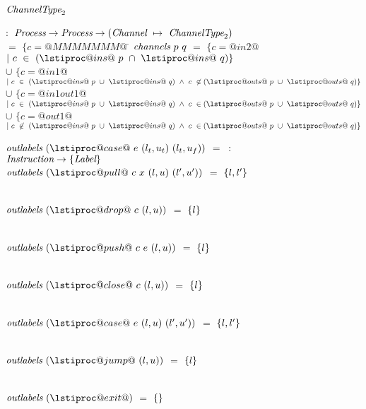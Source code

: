 \begin{figure}

\begin{tabbing}
$\textit{ChannelType}_2$   \TABDEF \kill

 \> $:$ \> $\textit{Process} \to \textit{Process} \to (\textit{Channel} ~\mapsto~ \textit{ChannelType}_2)$ \\

  \> $=$    \> $\{ c=@MMMMMMM@~$\= \kill
$\textit{channels}~p~q$
  \> $=$    \> $\{ c=@in2@$
            \> $|~c~\in~(\lstiproc@ins@~p~\cap~\lstiproc@ins@~q) \}$ 
            \\

  \> $\cup$ \> $\{ c=@in1@$
            \> $ |~c~\in~(\lstiproc@ins@~p~\cup~\lstiproc@ins@~q)~\wedge~c~\not\in(\lstiproc@outs@~p~\cup~\lstiproc@outs@~q) \}$ \\

  \> $\cup$ \> $\{ c=@in1out1@$
            \> $|~c~\in~(\lstiproc@ins@~p~\cup~\lstiproc@ins@~q)~\wedge~c~\in(\lstiproc@outs@~p~\cup~\lstiproc@outs@~q) \}$ \\

  \> $\cup$ \> $\{ c=@out1@$
            \> $ |~c~\not\in~(\lstiproc@ins@~p~\cup~\lstiproc@ins@~q)~\wedge~c~\in(\lstiproc@outs@~p~\cup~\lstiproc@outs@~q) \}$ 
\end{tabbing}

\newcommand\funClauseDef[3]
{ $\ti{#1}~(#2)$ \> $=$ \> $#3$
}
\newcommand\outlabelsDef[2]
{ \funClauseDef{outlabels}{#1}{\sgl{#2}} 
}

\vspace{1ex}
\begin{tabbing}
$\ti{outlabels}~(\lstiproc@case@~e~(l_t,u_t)~(l_t,u_f))$ \TABSKIP $=$ \TABSKIP \kill
{} \> $~:$ \> $\textit{Instruction} \to \{ \textit{Label} \}$ \\
\outlabelsDef{\lstiproc@pull@~c~x~(l,u)~(l',u')}{l,l'}              \\
\outlabelsDef{\lstiproc@drop@~c~(l,u)}{l}                \\
\outlabelsDef{\lstiproc@push@~c~e~(l,u)}{l}              \\
\outlabelsDef{\lstiproc@close@~c~(l,u)}{l}              \\
\outlabelsDef{\lstiproc@case@~e~(l,u)~(l',u')}{l, l'}    \\
\outlabelsDef{\lstiproc@jump@~(l,u)}{l}                  \\
\outlabelsDef{\lstiproc@exit@}{}
\end{tabbing}


\end{figure}
